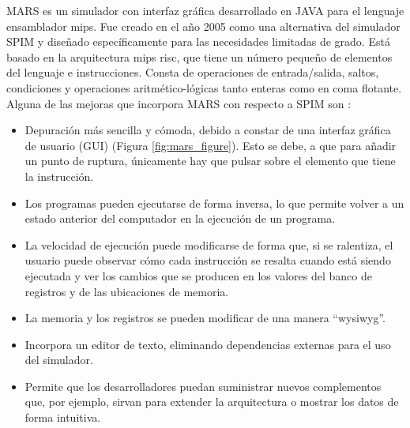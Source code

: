MARS \cite{vollmar2006mars} es un simulador con interfaz gráfica desarrollado en JAVA para el lenguaje \gls{ensamblador} \acrshort{mips}. Fue creado en el año 2005 como una alternativa del simulador SPIM y diseñado específicamente para las necesidades limitadas de grado. Está basado en la arquitectura \acrshort{mips} \acrfull{risc}, que tiene un número pequeño de elementos del lenguaje e instrucciones. Consta de operaciones de entrada/salida, saltos, condiciones y operaciones aritmético-lógicas tanto enteras como en coma flotante. Alguna de las mejoras que incorpora MARS con respecto a SPIM son \cite{vegdahl2008mipspilot}: 

\begin{itemize}

\item Depuración más sencilla y cómoda, debido a constar de una interfaz gráfica de usuario (GUI) (Figura \ref{fig:mars_figure}). Esto se debe, a que para añadir un punto de ruptura, únicamente hay que pulsar sobre el elemento que tiene la instrucción.

\item Los programas pueden ejecutarse de forma inversa, lo que permite volver a un estado anterior del computador en la ejecución de un programa.

\item La velocidad de ejecución puede modificarse de forma que, si se ralentiza, el usuario puede observar cómo cada instrucción se resalta cuando está siendo ejecutada y ver los cambios que se producen en los valores del banco de registros y de las ubicaciones de memoria.

\item  La memoria y los registros se pueden modificar de una manera ``\acrfull{wysiwyg}''.

\item Incorpora un editor de texto, eliminando dependencias externas para el uso del simulador.

\item Permite que los desarrolladores puedan suministrar nuevos complementos que, por ejemplo, sirvan para extender la arquitectura o mostrar los datos de forma intuitiva.

\end{itemize}

